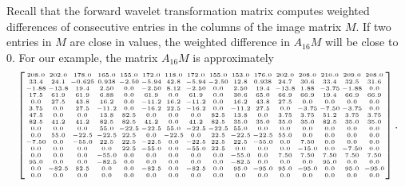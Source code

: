 Recall that the forward wavelet transformation matrix computes weighted differences of consecutive entries in the columns of the image matrix $M$. If two entries in $M$ are close in values, the weighted difference in $A_{16}M$ will be close to 0. For our example, the matrix $A_{16}M$ is  approximately
\[\left[\arraycolsep=1.0pt {\tiny{ \begin {array}{cccccccccccccccc}  208.0& 202.0& 178.0& 165.0&
 155.0& 172.0& 118.0& 172.0& 155.0& 153.0& 176.0& 202.0& 208.0& 210.0&
 209.0& 208.0\\ 33.4& 24.1&- 0.625& 0.938&- 2.50&-
 5.94& 42.8&- 5.94&- 2.50& 12.8& 0.938& 24.7& 30.6& 33.4& 32.5& 31.6
\\- 1.88&- 13.8& 19.4& 2.50& 0.0&- 2.50& 8.12&- 2.50
& 0.0& 2.50& 19.4&- 13.8& 1.88&- 3.75&- 1.88& 0.0\\
 17.5& 61.9& 61.9& 6.88& 0.0& 61.9& 0.0& 61.9& 0.0& 30.6& 65.0& 66.9&
 66.9& 19.4& 66.9& 66.9\\ 0.0& 27.5& 43.8& 16.2& 0.0
&- 11.2& 16.2&- 11.2& 0.0& 16.2& 43.8& 27.5& 0.0& 0.0& 0.0& 0.0
\\ 3.75& 0.0& 27.5&- 11.2& 0.0&- 16.2& 22.5&- 16.2&
 0.0&- 11.2& 27.5& 0.0&- 3.75&- 7.50&- 3.75& 0.0\\
 47.5& 0.0& 0.0& 13.8& 82.5& 0.0& 0.0& 0.0& 82.5& 13.8& 0.0& 3.75&
 3.75& 51.2& 3.75& 3.75\\ 82.5& 41.2& 41.2& 82.5&
 82.5& 41.2& 0.0& 41.2& 82.5& 35.0& 35.0& 35.0& 35.0& 82.5& 35.0& 35.0
\\ 0.0& 0.0& 0.0& 55.0&- 22.5&- 22.5& 55.0&- 22.5&-
 22.5& 55.0& 0.0& 0.0& 0.0& 0.0& 0.0& 0.0\\ 0.0&
 55.0&- 22.5&- 22.5& 22.5& 0.0&- 22.5& 0.0& 22.5&- 22.5&- 22.5& 55.0&
 0.0& 0.0& 0.0& 0.0\\- 7.50& 0.0&- 55.0& 22.5& 22.5&
- 22.5& 0.0&- 22.5& 22.5& 22.5&- 55.0& 0.0& 7.50& 0.0& 0.0& 0.0
\\ 0.0& 0.0& 0.0& 0.0& 22.5&- 55.0& 0.0&- 55.0& 22.5
& 0.0& 0.0& 0.0&- 15.0& 0.0&- 7.50& 0.0\\ 0.0& 0.0&
 0.0&- 55.0& 0.0& 0.0& 0.0& 0.0& 0.0&- 55.0& 0.0& 7.50& 7.50& 7.50&
 7.50& 7.50\\ 95.0& 0.0& 0.0&- 82.5& 0.0& 0.0& 0.0&
 0.0& 0.0&- 82.5& 0.0& 0.0& 0.0& 95.0& 0.0& 0.0\\
 0.0&- 82.5& 82.5& 0.0& 0.0&- 82.5& 0.0&- 82.5& 0.0& 95.0&- 95.0& 95.0
&- 95.0& 0.0& 95.0&- 95.0\\ 0.0& 0.0& 0.0& 0.0& 0.0&
 0.0& 0.0& 0.0& 0.0& 0.0& 0.0& 0.0& 0.0& 0.0& 0.0& 0.0\end {array} }}
 \right] .\]

